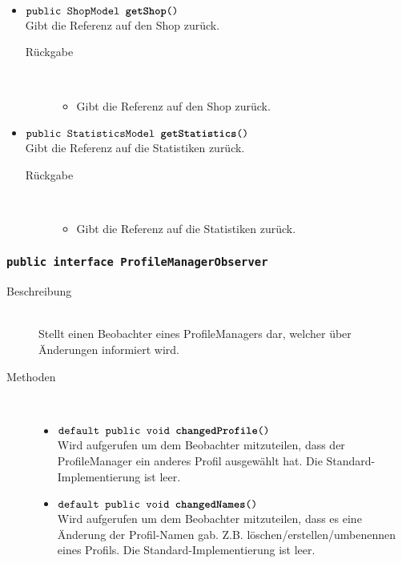 \begin{description}
\begin{itemize}
		\item $\texttt{public ShopModel \textbf{getShop}()}$ \\ Gibt die Referenz auf den Shop zurück.
		\begin{description}
			\item[Rückgabe] \hfill \\
			\vspace{-.8cm}
			\begin{itemize}
				\item Gibt die Referenz auf den Shop zurück.
			\end{itemize}
		\end{description}
		
		\item $\texttt{public StatisticsModel \textbf{getStatistics}()}$ \\ Gibt die Referenz auf die Statistiken zurück.
		\begin{description}
			\item[Rückgabe] \hfill \\
			\vspace{-.8cm}
			\begin{itemize}
				\item Gibt die Referenz auf die Statistiken zurück.
			\end{itemize}
		\end{description}
	\end{itemize}
\end{description}

\subsubsection{\normalfont \texttt{public interface \textbf{ProfileManagerObserver}}}

\begin{description}
\item[Beschreibung] \hfill \\ Stellt einen Beobachter eines ProfileManagers dar, welcher über Änderungen informiert wird.

\item[Methoden] \hfill \\
	\vspace{-.8cm}
	\begin{itemize}
		\item $\texttt{default public void \textbf{changedProfile}()}$ \\ Wird aufgerufen um dem Beobachter mitzuteilen, 
		dass der ProfileManager ein anderes Profil ausgewählt hat. Die Standard-Implementierung ist leer.
		\item $\texttt{default public void \textbf{changedNames}()}$ \\ Wird aufgerufen um dem Beobachter mitzuteilen, 
		dass es eine Änderung der Profil-Namen gab. Z.B. löschen/erstellen/umbenennen eines Profils. Die Standard-Implementierung ist leer.
	\end{itemize}
\end{description}

